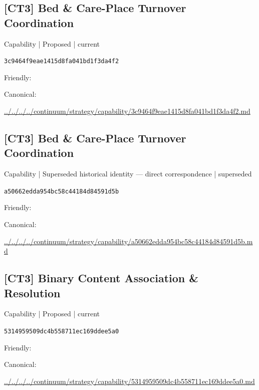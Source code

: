 \documentclass[10pt,a4paper]{article}
\begin{document}
\subsection*{[CT3] Bed \& Care-Place Turnover Coordination}
{\small Capability | Proposed | current}\par
\texttt{3c9464f9eae1415d8fa041bd1f3da4f2}\par
Friendly: \par
Canonical: \par
{\footnotesize\url{../../../../continuum/strategy/capability/3c9464f9eae1415d8fa041bd1f3da4f2.md}}\par
\subsection*{[CT3] Bed \& Care-Place Turnover Coordination}
{\small Capability | Superseded historical identity — direct correspondence | superseded}\par
\texttt{a50662edda954bc58c44184d84591d5b}\par
Friendly: \par
Canonical: \par
{\footnotesize\url{../../../../continuum/strategy/capability/a50662edda954bc58c44184d84591d5b.md}}\par
\subsection*{[CT3] Binary Content Association \& Resolution}
{\small Capability | Proposed | current}\par
\texttt{5314959509dc4b558711ec169ddee5a0}\par
Friendly: \par
Canonical: \par
{\footnotesize\url{../../../../continuum/strategy/capability/5314959509dc4b558711ec169ddee5a0.md}}\par
\end{document}
